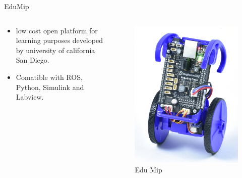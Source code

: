 \documentclass{beamer}
\begin{document}
\begin{frame}{EduMip}
\begin{columns}
\begin{column}{0.5\textwidth}
\begin{block}{}
\begin{itemize}
\item low cost open platform for learning purposes developed by university of california San Diego.
\item Comatible with ROS, Python, Simulink and Labview.
\end{itemize}
\end{block}
\end{column}
\begin{column}{0.5\textwidth}
\begin{center}
\begin{figure}
\includegraphics[scale=0.25]{figs/img/eduMip.jpeg}
\caption{Edu Mip}
\end{figure}
\end{center}
\end{column}
\end{columns}
\end{frame}
\end{document}
